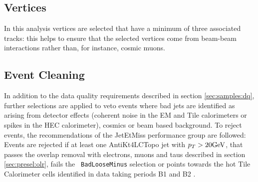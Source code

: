 \subsection{Vertices} 
\label{sec:presel:vertices}
In this analysis vertices are selected that have a minimum of three
associated tracks: this helps to ensure that the selected vertices
come from beam-beam interactions rather than, for instance, cosmic
muons.

\subsection{Event Cleaning}
\label{sec:presel:celaning}

In addition to the data quality requirements described in section
\ref{sec:samples:dq}, further selections are applied to veto events
where bad jets are identified as arising from detector effects
(coherent noise in the EM and Tile calorimeters or spikes in the HEC
calorimeter), cosmics or beam based background. To reject events, the
recommendations of the JetEtMiss performance group \cite{TWIKI_JETMET}
are followed: Events are rejected if at least one AntiKt4LCTopo jet
with $p_T>20\text{GeV}$, that passes the overlap removal with electrons,
muons and taus described in section \ref{sec:presel:olr}, fails the {\tt
BadLooseMinus} selection or points towards the hot Tile Calorimeter
cells identified in data taking periods B1 and B2 \cite{hottile}.

